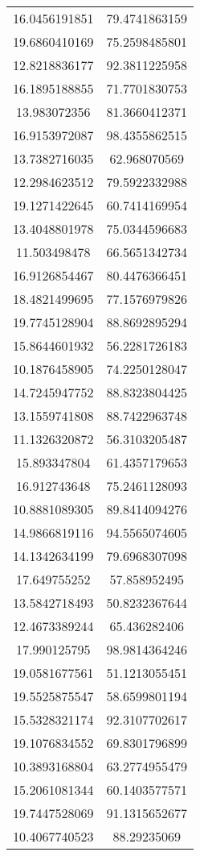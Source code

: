 \begin{table}
\begin{tabular}{cc}
16.0456191851 & 79.4741863159 \\
19.6860410169 & 75.2598485801 \\
12.8218836177 & 92.3811225958 \\
16.1895188855 & 71.7701830753 \\
13.983072356 & 81.3660412371 \\
16.9153972087 & 98.4355862515 \\
13.7382716035 & 62.968070569 \\
12.2984623512 & 79.5922332988 \\
19.1271422645 & 60.7414169954 \\
13.4048801978 & 75.0344596683 \\
11.503498478 & 66.5651342734 \\
16.9126854467 & 80.4476366451 \\
18.4821499695 & 77.1576979826 \\
19.7745128904 & 88.8692895294 \\
15.8644601932 & 56.2281726183 \\
10.1876458905 & 74.2250128047 \\
14.7245947752 & 88.8323804425 \\
13.1559741808 & 88.7422963748 \\
11.1326320872 & 56.3103205487 \\
15.893347804 & 61.4357179653 \\
16.912743648 & 75.2461128093 \\
10.8881089305 & 89.8414094276 \\
14.9866819116 & 94.5565074605 \\
14.1342634199 & 79.6968307098 \\
17.649755252 & 57.858952495 \\
13.5842718493 & 50.8232367644 \\
12.4673389244 & 65.436282406 \\
17.990125795 & 98.9814364246 \\
19.0581677561 & 51.1213055451 \\
19.5525875547 & 58.6599801194 \\
15.5328321174 & 92.3107702617 \\
19.1076834552 & 69.8301796899 \\
10.3893168804 & 63.2774955479 \\
15.2061081344 & 60.1403577571 \\
19.7447528069 & 91.1315652677 \\
10.4067740523 & 88.29235069 \\

\end{tabular}
\end{table}
